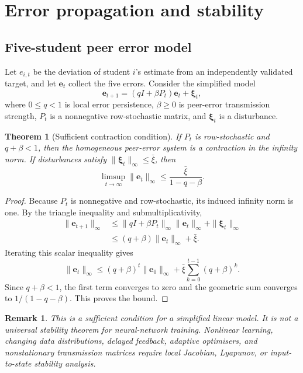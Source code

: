 \documentclass[11pt,a4paper]{article}
\newtheorem{theorem}[definition]{Theorem}
\newtheorem{remark}[definition]{Remark}
\begin{document}
\section{Error propagation and stability}

\subsection{Five-student peer error model}

Let \(e_{i,t}\) be the deviation of student \(i\)'s estimate from an independently validated target, and let \(\mathbf e_t\) collect the five errors. Consider the simplified model
\begin{equation}
\mathbf e_{t+1}
=
(qI+\beta P_t)\mathbf e_t+\boldsymbol{\xi}_t,
\end{equation}
where \(0\leq q<1\) is local error persistence, \(\beta\geq0\) is peer-error transmission strength, \(P_t\) is a nonnegative row-stochastic matrix, and \(\boldsymbol{\xi}_t\) is a disturbance.

\begin{theorem}[Sufficient contraction condition]
If \(P_t\) is row-stochastic and \(q+\beta<1\), then the homogeneous peer-error system is a contraction in the infinity norm. If disturbances satisfy \(\|\boldsymbol{\xi}_t\|_\infty\leq\bar\xi\), then
\begin{equation}
\limsup_{t\rightarrow\infty}\|\mathbf e_t\|_\infty
\leq
\frac{\bar\xi}{1-q-\beta}.
\end{equation}
\end{theorem}
\begin{proof}
Because \(P_t\) is nonnegative and row-stochastic, its induced infinity norm is one. By the triangle inequality and submultiplicativity,
\begin{align}
\|\mathbf e_{t+1}\|_\infty
&\leq
\|qI+\beta P_t\|_\infty\|\mathbf e_t\|_\infty
+\|\boldsymbol{\xi}_t\|_\infty\\
&\leq
(q+\beta)\|\mathbf e_t\|_\infty+\bar\xi.
\end{align}
Iterating this scalar inequality gives
\begin{equation}
\|\mathbf e_t\|_\infty
\leq
(q+\beta)^t\|\mathbf e_0\|_\infty
+
\bar\xi\sum_{k=0}^{t-1}(q+\beta)^k.
\end{equation}
Since \(q+\beta<1\), the first term converges to zero and the geometric sum converges to \(1/(1-q-\beta)\). This proves the bound.
\end{proof}

\begin{remark}
This is a sufficient condition for a simplified linear model. It is not a universal stability theorem for neural-network training. Nonlinear learning, changing data distributions, delayed feedback, adaptive optimisers, and nonstationary transmission matrices require local Jacobian, Lyapunov, or input-to-state stability analysis.
\end{remark}
\end{document}
